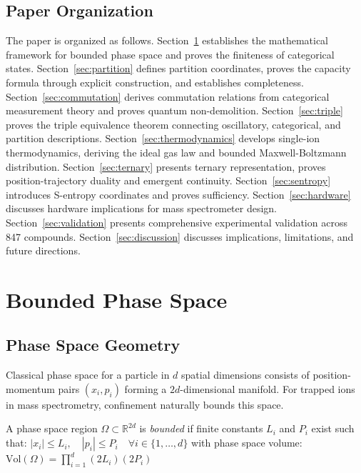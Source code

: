 \subsection{Paper Organization}

The paper is organized as follows. Section~\ref{sec:bounded} establishes the mathematical framework for bounded phase space and proves the finiteness of categorical states. Section~\ref{sec:partition} defines partition coordinates, proves the capacity formula through explicit construction, and establishes completeness. Section~\ref{sec:commutation} derives commutation relations from categorical measurement theory and proves quantum non-demolition. Section~\ref{sec:triple} proves the triple equivalence theorem connecting oscillatory, categorical, and partition descriptions. Section~\ref{sec:thermodynamics} develops single-ion thermodynamics, deriving the ideal gas law and bounded Maxwell-Boltzmann distribution. Section~\ref{sec:ternary} presents ternary representation, proves position-trajectory duality and emergent continuity. Section~\ref{sec:sentropy} introduces S-entropy coordinates and proves sufficiency. Section~\ref{sec:hardware} discusses hardware implications for mass spectrometer design. Section~\ref{sec:validation} presents comprehensive experimental validation across 847 compounds. Section~\ref{sec:discussion} discusses implications, limitations, and future directions.

\section{Bounded Phase Space}
\label{sec:bounded}

\subsection{Phase Space Geometry}

Classical phase space for a particle in $d$ spatial dimensions consists of position-momentum pairs $(x_i, p_i)$ forming a $2d$-dimensional manifold. For trapped ions in mass spectrometry, confinement naturally bounds this space.

\begin{definition}
\label{def:bounded}
A phase space region $\Omega \subset \mathbb{R}^{2d}$ is \emph{bounded} if finite constants $L_i$ and $P_i$ exist such that:
$
|x_i| \leq L_i, \quad |p_i| \leq P_i \quad \forall i \in \{1, \ldots, d\}
$
with phase space volume:
$
\mathrm{Vol}(\Omega) = \prod_{i=1}^{d} (2L_i)(2P_i)
$
\end{definition}

